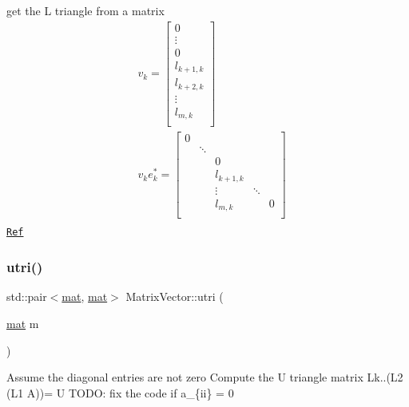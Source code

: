 get the L triangle from a matrix \[ \begin{equation} \begin{aligned} &v_k = \begin{bmatrix} 0 \\ \vdots \\ 0 \\ l_{k+1,k} \\ l_{k+2,k} \\ \vdots \\ l_{m,k} \\ \end{bmatrix} \\ &v_k e_{k}^{*} = \begin{bmatrix} 0 & & & & \\ & \ddots & & & \\ & & 0 & & \\ & & l_{k+1,k} & & \\ & & \vdots & \ddots & \\ & & l_{m,k} & & 0 \\ \end{bmatrix} \\ \end{aligned} \end{equation} \] \href{http://localhost/pdf/lu_derive_triangle_matrix.pdf}{\tt Ref} \mbox{\label{namespace_matrix_vector_a21f46727b11ebce5213b7338153274c2}} 
\subsubsection{\texorpdfstring{utri()}{utri()}}
{\footnotesize\ttfamily std\+::pair$<$\mbox{\hyperlink{class_matrix_vector_1_1mat}{mat}}, \mbox{\hyperlink{class_matrix_vector_1_1mat}{mat}}$>$ Matrix\+Vector\+::utri (\begin{DoxyParamCaption}\item[{\mbox{\hyperlink{class_matrix_vector_1_1mat}{mat}}}]{m }\end{DoxyParamCaption})}

Assume the diagonal entries are not zero Compute the U triangle matrix Lk..(L2 (L1 A))= U T\+O\+DO\+: fix the code if a\+\_\+\{ii\} = 0 